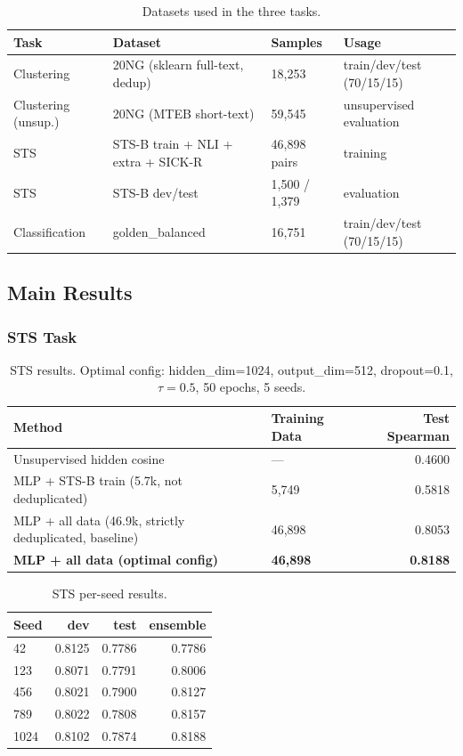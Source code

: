 \documentclass[11pt]{article}
\begin{document}
\begin{table}[h]
\centering
\begin{tabular}{llll}
\toprule
Task & Dataset & Samples & Usage \\
\midrule
Clustering & 20NG (sklearn full-text, dedup) & 18,253 & train/dev/test (70/15/15) \\
Clustering (unsup.) & 20NG (MTEB short-text) & 59,545 & unsupervised evaluation \\
STS & STS-B train + NLI + extra + SICK-R & 46,898 pairs & training \\
STS & STS-B dev/test & 1,500 / 1,379 & evaluation \\
Classification & golden\_balanced & 16,751 & train/dev/test (70/15/15) \\
\bottomrule
\end{tabular}
\caption{Datasets used in the three tasks.}
\end{table}

\subsection{Main Results}

\subsubsection{STS Task}

\begin{table}[h]
\centering
\begin{tabular}{llr}
\toprule
Method & Training Data & Test Spearman \\
\midrule
Unsupervised hidden cosine & --- & 0.4600 \\
MLP + STS-B train (5.7k, not deduplicated) & 5,749 & 0.5818 \\
MLP + all data (46.9k, strictly deduplicated, baseline) & 46,898 & 0.8053 \\
\textbf{MLP + all data (optimal config)} & \textbf{46,898} &
\textbf{0.8188} \\
\bottomrule
\end{tabular}
\caption{STS results. Optimal config: hidden\_dim=1024, output\_dim=512,
dropout=0.1, $\tau=0.5$, 50 epochs, 5 seeds.}
\end{table}

\begin{table}[h]
\centering
\begin{tabular}{lrrr}
\toprule
Seed & dev & test & ensemble \\
\midrule
42 & 0.8125 & 0.7786 & 0.7786 \\
123 & 0.8071 & 0.7791 & 0.8006 \\
456 & 0.8021 & 0.7900 & 0.8127 \\
789 & 0.8022 & 0.7808 & 0.8157 \\
1024 & 0.8102 & 0.7874 & 0.8188 \\
\bottomrule
\end{tabular}
\caption{STS per-seed results.}
\end{table}
\end{document}
